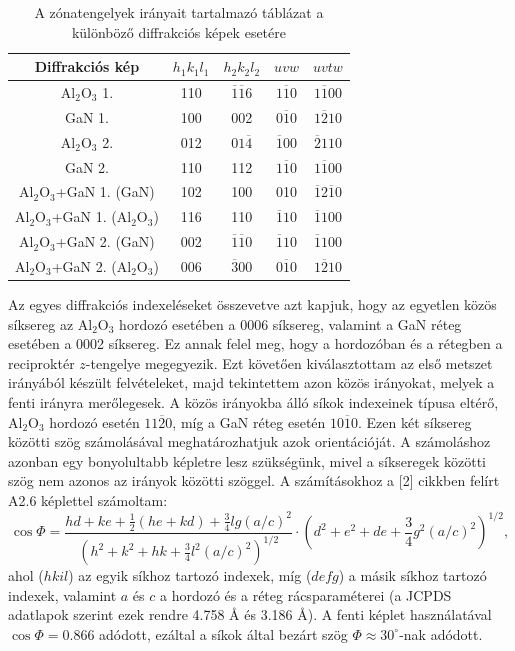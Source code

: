 \documentclass[12pt,a4paper]{article}
\begin{document}
\begin{table}[!h]
\begin{center}
\begin{tabular}{|c|c|c|c|c|}
\hline
Diffrakciós kép & $h_1k_1l_1$ & $h_2k_2l_2$ & $uvw$ & $uvtw$ \\
\hline
Al$_2$O$_3$ 1. & 110 & $\overline{1}\overline{1}6$ & $1\overline{1}0$ & $1\overline{1}00$\\
\hline
GaN 1. & 100 & 002 & $0\overline{1}0$ & $1\overline{2}10$ \\
\hline
Al$_2$O$_3$ 2. & 012 & $01\overline{4}$ & $\overline{1}00$ & $\overline{2}110$ \\
\hline
GaN 2. & 110 & 112 & $1\overline{1}0$ & $1\overline{1}00$ \\
\hline
\hline
Al$_2$O$_3$+GaN 1. (GaN) & 102 & 100 & 010 & $\overline{1}2\overline{1}0$ \\
\hline
Al$_2$O$_3$+GaN 1. (Al$_2$O$_3$) & 116 & 110 & $\overline{1}10$ & $\overline{1}100$\\
\hline
\hline
Al$_2$O$_3$+GaN 2. (GaN) & 002 & $\overline{1}\overline{1}0$ & $\overline{1}10 $ & $\overline{1}100$ \\
\hline
Al$_2$O$_3$+GaN 2. (Al$_2$O$_3$) & 006 & $\overline{3}00$ & $0\overline{1}0$ & $1\overline{2}10$\\
\hline
\end{tabular}
\caption{A zónatengelyek irányait tartalmazó táblázat a különböző diffrakciós képek esetére}
\label{tab:zonat}
\end{center}
\end{table}
\newpage
\hspace*{10pt} Az egyes diffrakciós indexeléseket összevetve azt kapjuk, hogy az egyetlen közös síksereg az Al$_2$O$_3$ hordozó esetében a 0006 síksereg, valamint a GaN réteg esetében a 0002 síksereg. Ez annak felel meg, hogy a hordozóban és a rétegben a reciproktér $z$-tengelye megegyezik. Ezt követően kiválasztottam az első metszet irányából készült felvételeket, majd tekintettem azon közös irányokat, melyek a fenti irányra merőlegesek. A közös irányokba álló síkok indexeinek típusa eltérő, Al$_2$O$_3$ hordozó esetén $11\overline{2}0$, míg a GaN réteg esetén $10\overline{1}0$. Ezen két síksereg közötti szög számolásával meghatározhatjuk azok orientációját. A számoláshoz azonban egy bonyolultabb képletre lesz szükségünk, mivel a síkseregek közötti szög nem azonos az irányok közötti szöggel. A számításokhoz a [2] cikkben felírt A2.6 képlettel számoltam:
\begin{equation}
\cos \Phi = \frac{hd+ke+\frac{1}{2}(he+kd)+\frac{3}{4}lg(a/c)^2}{(h^2+k^2+hk+\frac{3}{4}l^2(a/c)^2)^{1/2}}\cdot(d^2+e^2+de+\frac{3}{4}g^2(a/c)^2)^{1/2},
\end{equation}
ahol ($hkil$) az egyik síkhoz tartozó indexek, míg ($defg$) a másik síkhoz tartozó indexek, valamint $a$ és $c$ a hordozó és a réteg rácsparaméterei (a JCPDS adatlapok szerint ezek rendre 4.758 \AA\hspace*{3pt} és 3.186 \AA). A fenti képlet használatával $\cos \Phi = 0.866$ adódott, ezáltal a síkok által bezárt szög $\Phi \approx 30  ^{\circ}$-nak adódott.
\end{document}
